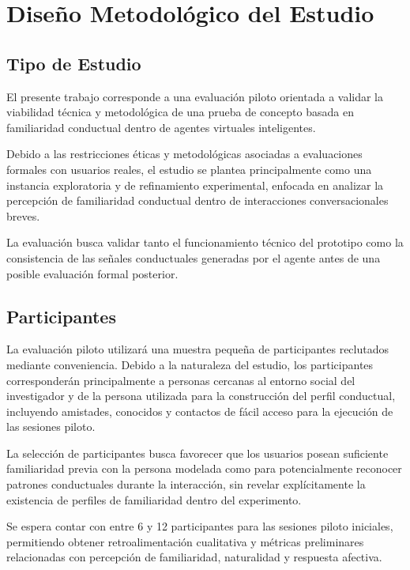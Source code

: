 \documentclass[12pt]{article}
\begin{document}
\section{Diseño Metodológico del Estudio}

\subsection{Tipo de Estudio}

El presente trabajo corresponde a una evaluación piloto orientada a validar la viabilidad técnica y metodológica de una prueba de concepto basada en familiaridad conductual dentro de agentes virtuales inteligentes.

Debido a las restricciones éticas y metodológicas asociadas a evaluaciones formales con usuarios reales, el estudio se plantea principalmente como una instancia exploratoria y de refinamiento experimental, enfocada en analizar la percepción de familiaridad conductual dentro de interacciones conversacionales breves.

La evaluación busca validar tanto el funcionamiento técnico del prototipo como la consistencia de las señales conductuales generadas por el agente antes de una posible evaluación formal posterior.



\subsection{Participantes}

La evaluación piloto utilizará una muestra pequeña de participantes reclutados mediante conveniencia. Debido a la naturaleza del estudio, los participantes corresponderán principalmente a personas cercanas al entorno social del investigador y de la persona utilizada para la construcción del perfil conductual, incluyendo amistades, conocidos y contactos de fácil acceso para la ejecución de las sesiones piloto.

La selección de participantes busca favorecer que los usuarios posean suficiente familiaridad previa con la persona modelada como para potencialmente reconocer patrones conductuales durante la interacción, sin revelar explícitamente la existencia de perfiles de familiaridad dentro del experimento.

Se espera contar con entre 6 y 12 participantes para las sesiones piloto iniciales, permitiendo obtener retroalimentación cualitativa y métricas preliminares relacionadas con percepción de familiaridad, naturalidad y respuesta afectiva.
\end{document}
